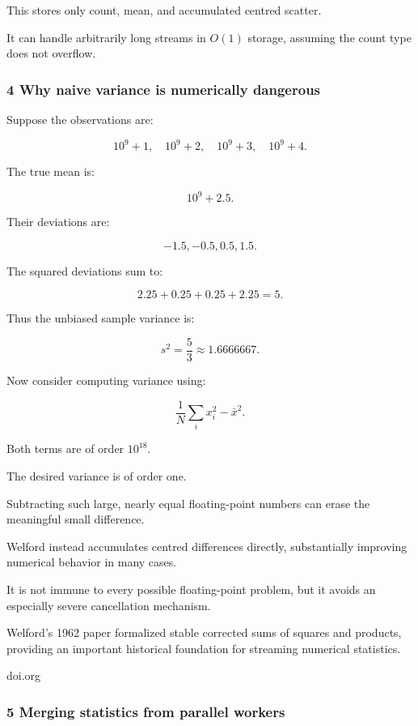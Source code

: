 This stores only count, mean, and accumulated centred scatter.

It can handle arbitrarily long streams in \(O(1)\) storage, assuming the count type does not overflow.

\subsubsection{4 Why naive variance is numerically dangerous}\label{02-foundations-ii-ch030-why-naive-variance-is-numerically-dangerous}

Suppose the observations are:

\[
 10^9+1,\quad10^9+2,\quad10^9+3,\quad10^9+4.
\]

The true mean is:

\[
 10^9+2.5.
\]

Their deviations are:

\[
 -1.5,-0.5,0.5,1.5.
\]

The squared deviations sum to:

\[
 2.25+0.25+0.25+2.25=5.
\]

Thus the unbiased sample variance is:

\[
 \boxed{s^2=\frac53\approx1.6666667}.
\]

Now consider computing variance using:

\[
 \frac1N\sum_ix_i^2-\bar x^2.
\]

Both terms are of order \(10^{18}\).

The desired variance is of order one.

Subtracting such large, nearly equal floating-point numbers can erase the meaningful small difference.

Welford instead accumulates centred differences directly, substantially improving numerical behavior in many cases.

It is not immune to every possible floating-point problem, but it avoids an especially severe cancellation mechanism.

Welford's 1962 paper formalized stable corrected sums of squares and products, providing an important historical foundation for streaming numerical statistics.

doi.org

\subsubsection{5 Merging statistics from parallel workers}\label{02-foundations-ii-ch030-merging-statistics-from-parallel-workers}

